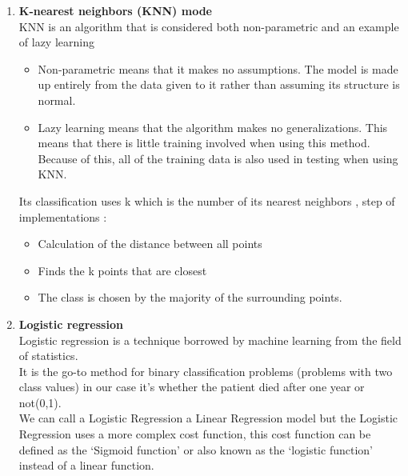 \documentclass[a4paper, 11pt, oneside]{article} %
\begin{document}
\begin {enumerate}
Advantages of Naive Bayes:
\begin{enumerate}
\item When assumption of independent predictors holds true, a Naive Bayes classifier performs better as compared to other models.

\item Naive Bayes requires a small amount of training data to estimate the test data. So, the training period is less.

\item Naive Bayes is also easy to implement.
\end{enumerate}
\newpage


\item \textbf { K-nearest neighbors (KNN) mode}  \\
KNN is an algorithm that is considered both non-parametric and an example of lazy learning
\begin{itemize}
\item Non-parametric means that it makes no assumptions. The model is made up entirely from the data given to it rather than assuming its structure is normal.
\item Lazy learning means that the algorithm makes no generalizations. This means that there is little training involved when using this method. Because of this, all of the training data is also used in testing when using KNN.
\end{itemize}
 Its classification uses k which is the number of its nearest neighbors , step of implementations :
\begin{itemize}
\item Calculation of the distance between all points
\item Finds the k points that are closest
\item The class is chosen by the majority of the surrounding points.
\end{itemize}

\item  \textbf { Logistic regression }   \\
Logistic regression is a technique borrowed by machine learning from the field of statistics.\\
It is the go-to method for binary classification problems (problems with two class values) in our case it’s whether the patient died after one year or not(0,1).\\
We can call a Logistic Regression a Linear Regression model but the Logistic Regression uses a more complex cost function, this cost function can be defined as the ‘Sigmoid function’ or also known as the ‘logistic function’ instead of a linear function.\\



\end{enumerate}
\end{document}
